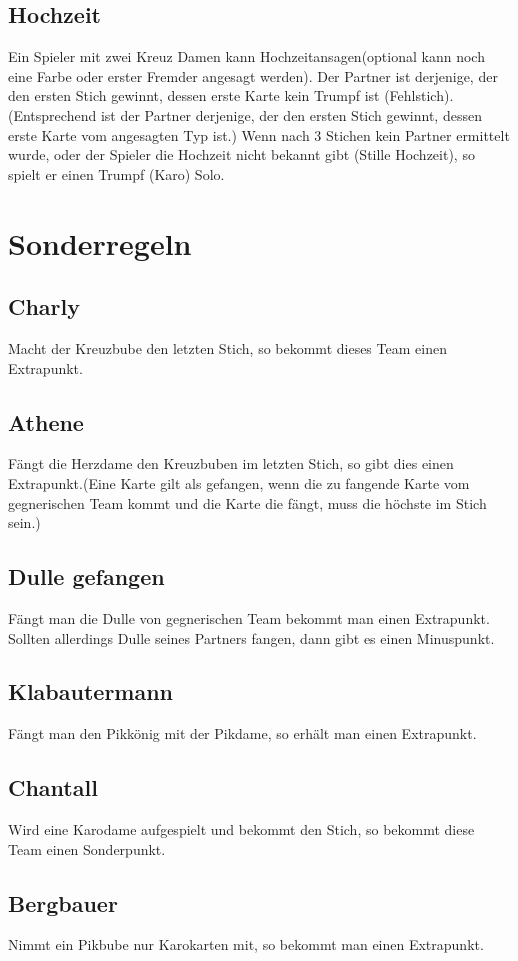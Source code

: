 \documentclass[a4paper,11pt]{article}
\begin{document}
\subsection{Hochzeit}
Ein Spieler mit zwei Kreuz Damen kann \glqq Hochzeit\grqq\;ansagen(optional kann noch eine Farbe oder erster Fremder angesagt werden). Der Partner ist derjenige, der den ersten Stich gewinnt, dessen erste Karte kein Trumpf ist (Fehlstich).(Entsprechend ist der Partner derjenige, der den ersten Stich gewinnt, dessen erste Karte vom angesagten Typ ist.) Wenn nach 3 Stichen kein Partner ermittelt wurde, oder der Spieler die Hochzeit nicht bekannt gibt (Stille Hochzeit), so spielt er einen Trumpf (Karo) Solo. 

\section{Sonderregeln}
\subsection{Charly} Macht der Kreuzbube den letzten Stich, so bekommt dieses Team einen Extrapunkt.
\subsection{Athene} Fängt die Herzdame den Kreuzbuben im letzten Stich, so gibt dies einen Extrapunkt.(Eine Karte gilt als gefangen, wenn die zu fangende Karte vom gegnerischen Team kommt und die Karte die fängt, muss die höchste im Stich sein.)
\subsection{Dulle gefangen}Fängt man die Dulle von gegnerischen Team bekommt man einen Extrapunkt. Sollten allerdings Dulle seines Partners \grqq fangen\glqq, dann gibt es einen Minuspunkt.
\subsection{Klabautermann} Fängt man den Pikkönig mit der Pikdame, so erhält man einen Extrapunkt.
\subsection{Chantall} Wird eine Karodame aufgespielt und bekommt den Stich, so bekommt diese Team einen Sonderpunkt.
\subsection{Bergbauer} Nimmt ein Pikbube nur Karokarten mit, so bekommt man einen Extrapunkt.
\end{document}
